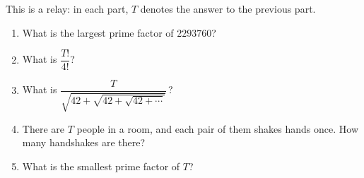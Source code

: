 This is a relay: in each part, $T$ denotes the answer to the previous part.
\begin{enumerate}
\item What is the largest prime factor of $2293760$?
\item What is $\dfrac{T!}{4!}$?
\item What is $\dfrac{T}{\sqrt{42+\sqrt{42+\sqrt{42+\cdots}}}}$\,?
\item There are $T$ people in a room, and each pair of them shakes hands once. How many handshakes are there?
\item What is the smallest prime factor of $T$?
\end{enumerate}
